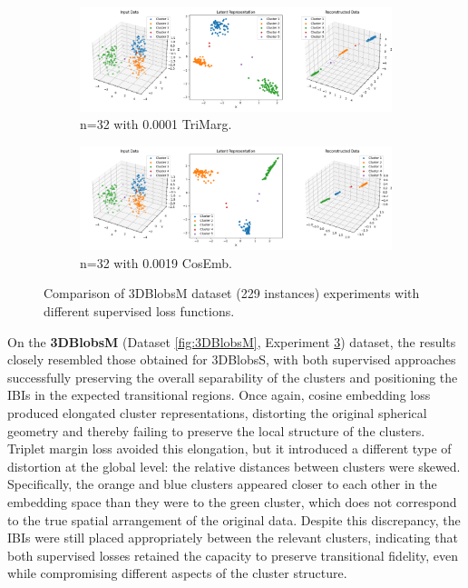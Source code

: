 \begin{figure}[htbp]
  \centering
  \begin{subfigure}[b]{1.0\textwidth}
    \centering
    \includegraphics[width=\linewidth]{images/RQ3/tri/3DBlobsM_32_0.0001.png}
    \caption{n=32 with 0.0001 TriMarg.}
    \label{fig:RQ3/tri/3DBlobsM}
  \end{subfigure}
  \hfill
  \begin{subfigure}[b]{1.0\textwidth}
    \centering
    \includegraphics[width=\linewidth]{images/RQ3/cos/3DBlobsM_32_0.0019.png}
    \caption{n=32 with 0.0019 CosEmb.}
    \label{fig:RQ3/cos/3DBlobsM}
  \end{subfigure} 

  \caption{Comparison of 3DBlobsM dataset (229 instances) experiments with different
supervised loss functions.}
  \label{fig:RQ3/3DBlobsM}
\end{figure}

On the \textbf{3DBlobsM} (Dataset \ref{fig:3DBlobsM}, Experiment \ref{fig:RQ3/3DBlobsM}) dataset, the results closely resembled those obtained for 3DBlobsS, with both supervised approaches successfully preserving the overall separability of the clusters and positioning the IBIs in the expected transitional regions. Once again, cosine embedding loss produced elongated cluster representations, distorting the original spherical geometry and thereby failing to preserve the local structure of the clusters. Triplet margin loss avoided this elongation, but it introduced a different type of distortion at the global level: the relative distances between clusters were skewed. Specifically, the orange and blue clusters appeared closer to each other in the embedding space than they were to the green cluster, which does not correspond to the true spatial arrangement of the original data. Despite this discrepancy, the IBIs were still placed appropriately between the relevant clusters, indicating that both supervised losses retained the capacity to preserve transitional fidelity, even while compromising different aspects of the cluster structure.

